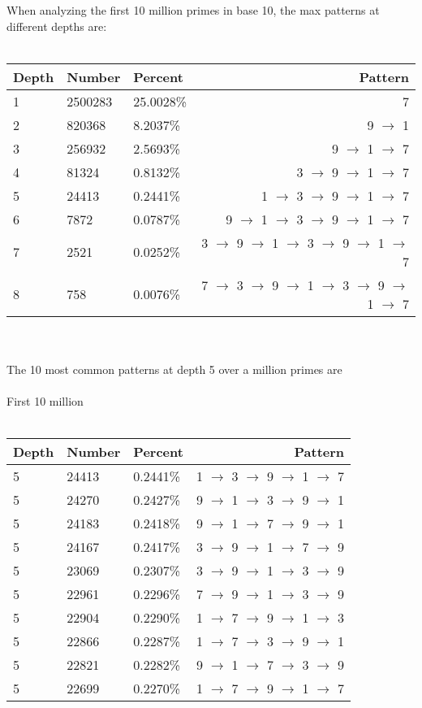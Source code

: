 \documentclass[13pt]{article}
\begin{document}
When analyzing the first 10 million primes in base 10, the max patterns at different depths are:\\\\
\begin{tabular}{ l l l r }
  Depth & Number & Percent & Pattern \\
  \hline
  1 & 2500283 & 25.0028\% & 7\\
  2 & 820368 & 8.2037\% & 9 $\rightarrow$ 1\\
  3 & 256932 & 2.5693\% & 9 $\rightarrow$ 1 $\rightarrow$ 7\\
  4 & 81324 & 0.8132\% & 3 $\rightarrow$ 9 $\rightarrow$ 1 $\rightarrow$ 7\\
  5 & 24413 & 0.2441\% & 1 $\rightarrow$ 3 $\rightarrow$ 9 $\rightarrow$ 1 $\rightarrow$ 7\\
  6 & 7872 & 0.0787\% & 9 $\rightarrow$ 1 $\rightarrow$ 3 $\rightarrow$ 9 $\rightarrow$ 1 $\rightarrow$ 7\\
  7 & 2521 & 0.0252\% & 3 $\rightarrow$ 9 $\rightarrow$ 1 $\rightarrow$ 3 $\rightarrow$ 9 $\rightarrow$ 1 $\rightarrow$ 7\\
  8 & 758 & 0.0076\% & 7 $\rightarrow$ 3 $\rightarrow$ 9 $\rightarrow$ 1 $\rightarrow$ 3 $\rightarrow$ 9 $\rightarrow$ 1 $\rightarrow$ 7\\
  \end{tabular}
\\\\The 10 most common patterns at depth 5 over a million primes are\\\\
First 10 million\\\\
\begin{tabular}{ l l l r }
  Depth & Number & Percent & Pattern \\
  \hline
    5 & 24413 & 0.2441\% & 1 $\rightarrow$ 3 $\rightarrow$ 9 $\rightarrow$ 1 $\rightarrow$ 7\\
    5 & 24270 & 0.2427\% & 9 $\rightarrow$ 1 $\rightarrow$ 3 $\rightarrow$ 9 $\rightarrow$ 1\\
    5 & 24183 & 0.2418\% & 9 $\rightarrow$ 1 $\rightarrow$ 7 $\rightarrow$ 9 $\rightarrow$ 1\\
    5 & 24167 & 0.2417\% & 3 $\rightarrow$ 9 $\rightarrow$ 1 $\rightarrow$ 7 $\rightarrow$ 9\\
    5 & 23069 & 0.2307\% & 3 $\rightarrow$ 9 $\rightarrow$ 1 $\rightarrow$ 3 $\rightarrow$ 9\\
    5 & 22961 & 0.2296\% & 7 $\rightarrow$ 9 $\rightarrow$ 1 $\rightarrow$ 3 $\rightarrow$ 9\\
    5 & 22904 & 0.2290\% & 1 $\rightarrow$ 7 $\rightarrow$ 9 $\rightarrow$ 1 $\rightarrow$ 3\\
    5 & 22866 & 0.2287\% & 1 $\rightarrow$ 7 $\rightarrow$ 3 $\rightarrow$ 9 $\rightarrow$ 1\\
    5 & 22821 & 0.2282\% & 9 $\rightarrow$ 1 $\rightarrow$ 7 $\rightarrow$ 3 $\rightarrow$ 9\\
    5 & 22699 & 0.2270\% & 1 $\rightarrow$ 7 $\rightarrow$ 9 $\rightarrow$ 1 $\rightarrow$ 7\\
  \end{tabular}
\end{document}
